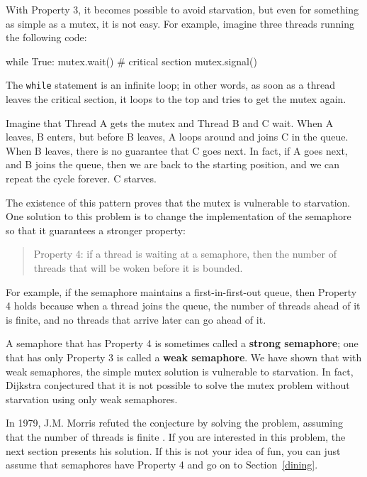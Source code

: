 \documentclass{book}
\begin{document}
With Property 3, it becomes possible to avoid starvation, but
even for something as simple as a mutex, it is not easy.
For example, imagine three threads
running the following code:


\begin{unbreakable}[title={Mutex loop}]{}
while True:
    mutex.wait()
    # critical section 
    mutex.signal()
\end{unbreakable}

The {\tt while} statement is an infinite loop; in other words,
as soon as a thread leaves the critical section, it loops to the
top and tries to get the mutex again.

Imagine that Thread A gets the mutex and Thread B and C wait.
When A leaves, B enters, but before B leaves, A loops around
and joins C in the queue.  When B leaves, there is no guarantee
that C goes next.  In fact, if A goes next, and B joins the
queue, then we are back to the starting position, and we can
repeat the cycle forever.  C starves.

The existence of this pattern proves that the mutex is
vulnerable to starvation.  One solution to this problem is
to change the implementation of the semaphore so that it
guarantees a stronger property:

\begin{quote}
    Property 4: if a thread is waiting at a semaphore, then the
    number of threads that will be woken before it is bounded.
\end{quote}

For example, if the semaphore maintains a first-in-first-out
queue, then Property 4 holds because when a thread joins the
queue, the number of threads ahead of it is finite, and
no threads that arrive later can go ahead of it.

A semaphore that has Property 4 is sometimes called a {\bf strong
        semaphore}; one that has only Property 3 is called a {\bf weak
        semaphore}.  We have shown that with weak semaphores, the simple mutex
solution is vulnerable to starvation.  In fact, Dijkstra conjectured
that it is not possible to solve the mutex problem without starvation
using only weak semaphores.

In 1979, J.M. Morris refuted the conjecture by solving the problem,
assuming that the number of threads is finite \cite{morris}.  If you
are interested in this problem, the next section presents his
solution.  If this is not your idea of fun, you can just assume that
semaphores have Property 4 and go on to Section~\ref{dining}.
\end{document}
